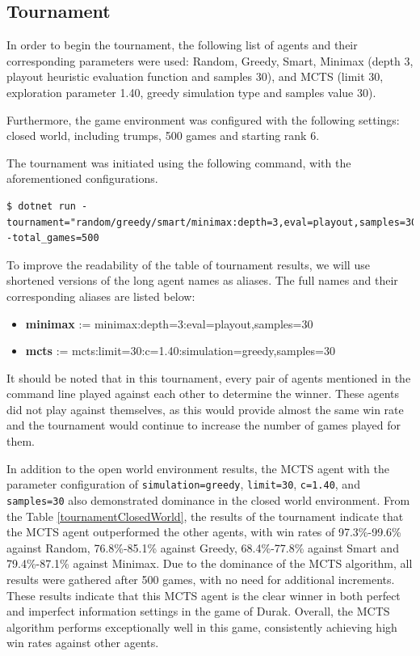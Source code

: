 \subsection{Tournament}
In order to begin the tournament, the following list of agents and their corresponding parameters were used: Random, Greedy, Smart, Minimax (depth 3, playout heuristic evaluation function and samples 30), and MCTS (limit 30, exploration parameter 1.40, greedy simulation type and samples value 30).

Furthermore, the game environment was configured with the following settings: closed world, including trumps, 500 games and starting rank 6.

The tournament was initiated using the following command, with the aforementioned configurations.

\begin{lstlisting}
$ dotnet run -tournament="random/greedy/smart/minimax:depth=3,eval=playout,samples=30/mcts:limit=30,c=1.40,simulation=greedy,samples=30" -total_games=500
\end{lstlisting}

To improve the readability of the table of tournament results, we will use shortened versions of the long agent names as aliases. The full names and their corresponding aliases are listed below:

\begin{itemize}
	\item \textbf{minimax} := minimax:depth=3:eval=playout,samples=30
	\item \textbf{mcts} := mcts:limit=30:c=1.40:simulation=greedy,samples=30
\end{itemize}


It should be noted that in this tournament, every pair of agents mentioned in the command line played against each other to determine the winner. These agents did not play against themselves, as this would provide almost the same win rate and the tournament would continue to increase the number of games played for them.

In addition to the open world environment results, the MCTS agent with the parameter configuration of \texttt{simulation=greedy}, \texttt{limit=30}, \texttt{c=1.40}, and \texttt{samples=30} also demonstrated dominance in the closed world environment. From the Table \ref{tournamentClosedWorld}, the results of the tournament indicate that the MCTS agent outperformed the other agents, with win rates of 97.3\%-99.6\% against Random, 76.8\%-85.1\% against Greedy, 68.4\%-77.8\% against Smart and 79.4\%-87.1\% against Minimax. Due to the dominance of the MCTS algorithm, all results were gathered after 500 games, with no need for additional increments. These results indicate that this MCTS agent is the clear winner in both perfect and imperfect information settings in the game of Durak. Overall, the MCTS algorithm performs exceptionally well in this game, consistently achieving high win rates against other agents.

